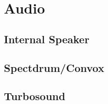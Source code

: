 \section{Audio}
\subsection{Internal Speaker}
\subsection{Spectdrum/Convox}
\subsection{Turbosound}
